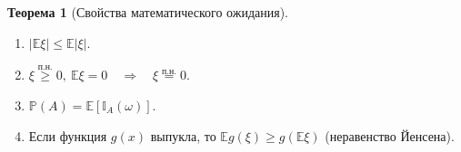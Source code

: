 \documentclass[oneside,final,14pt]{extreport}
\newcommand\myprob[1]{{\mathbb{P}(#1)}}
\theoremstyle{plain}
\theoremstyle{definition}
\theoremstyle{named}
\newtheorem*{namedthm}{Теорема}
\begin{document}
\begin{namedthm}[Свойства математического ожидания]
\begin{enumerate}
    {\bf Замечание.}
        Обратное неверно: из равенства $\mathbb{E}(\xi \eta) = \mathbb{E}\xi \mathbb{E} \eta$ {\it не следует} независимость величин $\xi$ и $\eta$.
    
    \item $|\mathbb{E}\xi| \leqslant \mathbb{E}|\xi|.$
    
    \item $\xi \overset{\text{п.н.}}{\geqslant} 0, \: \mathbb{E}\xi = 0 \quad \Rightarrow \quad \xi \overset{\text{п.н.}}{=} 0.$
    
    \item $\myprob{A} = \mathbb{E}\left[\mathbb{I}_A(\omega)\right].$
    
    \item Если функция $g(x)$ выпукла, то $\mathbb{E}g(\xi) \geqslant g(\mathbb{E}\xi)$ (неравенство Йенсена).
    
\end{enumerate}
\end{namedthm}
\end{document}
